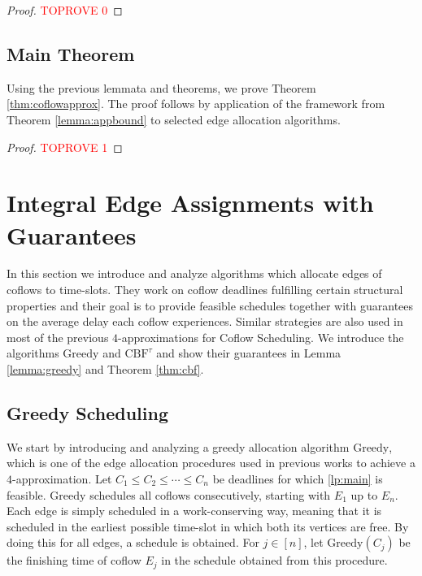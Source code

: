 \documentclass[11pt]{article}
\begin{document}
\begin{proof}\textcolor{red}{TOPROVE 0}\end{proof}


\subsection{Main Theorem}
Using the previous lemmata and theorems, we prove Theorem \ref{thm:coflowapprox}. The proof follows by application of the framework from Theorem \ref{lemma:appbound} to selected edge allocation algorithms.

\rsthmcoflowapprox*

\begin{proof}\textcolor{red}{TOPROVE 1}\end{proof}



\section{Integral Edge Assignments with Guarantees}\label{sec:schedflows}

In this section we introduce and analyze algorithms which allocate edges of coflows to time-slots. They work on coflow deadlines fulfilling certain structural properties and their goal is to provide feasible schedules together with guarantees on the average delay each coflow experiences. Similar strategies are also used in most of the previous $4$-approximations for Coflow Scheduling. We introduce the algorithms $\mathrm{Greedy}$ and $\mathrm{CBF}^\tau$ and show their guarantees in Lemma \ref{lemma:greedy} and Theorem \ref{thm:cbf}.

\subsection{Greedy Scheduling}
We start by introducing and analyzing a greedy allocation algorithm $\mathrm{Greedy}$, which is one of the edge allocation procedures used in previous works to achieve a $4$-approximation. Let $C_1 \le C_2 \le \cdots \le C_n$ be deadlines for which \ref{lp:main} is feasible. $\mathrm{Greedy}$ schedules all coflows consecutively, starting with $E_1$ up to $E_n$. Each edge is simply scheduled in a work-conserving way, meaning that it is scheduled in the earliest possible time-slot in which both its vertices are free. By doing this for all edges, a schedule is obtained. For $j \in [n]$, let $\mathrm{Greedy}(C_j)$ be the finishing time of coflow $E_j$ in the schedule obtained from this procedure.
\end{document}
